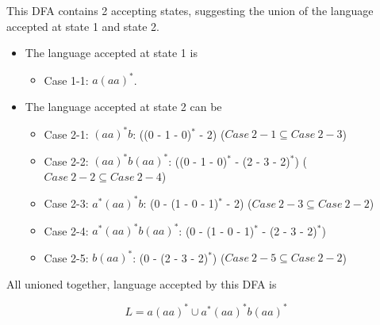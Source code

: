\documentclass[12pt]{article}
\begin{document}
\section{}
\begin{center}
\end{center}
This DFA contains 2 accepting states, suggesting the union of the language accepted at state 1 and state 2.
\begin{itemize}
    \item The language accepted at state 1 is 
    \begin{itemize}
        \item Case 1-1: \(a(aa)^*\).
    \end{itemize}
    \item The language accepted at state 2 can be 
    \begin{itemize}
        \item  Case 2-1: \((aa)^*b\): ((0 - 1 - 0)\(^*\) - 2) (\(Case\ 2-1 \subseteq Case\ 2-3\))
        \item  Case 2-2: \((aa)^*b(aa)^*\):  ((0 - 1 - 0)\(^*\) - (2 - 3 - 2)\(^*\)) (\(Case\ 2-2 \subseteq Case\ 2-4\))
        \item  Case 2-3: \(a^*(aa)^*b\):  (0 - (1 - 0 - 1)\(^*\) - 2) (\(Case\ 2-3 \subseteq Case\ 2-2\))
        \item  Case 2-4: \(a^*(aa)^*b(aa)^*\):  (0 - (1 - 0 - 1)\(^*\) - (2 - 3 - 2)\(^*\))
        \item  Case 2-5: \(b(aa)^*\): (0 - (2 - 3 - 2)\(^*\)) (\(Case\ 2-5 \subseteq Case\ 2-2\))
    \end{itemize}
\end{itemize}
All unioned together, language accepted by this DFA is 
    \begin{center}
        \[L = a(aa)^* \cup a^*(aa)^*b(aa)^*\]
    \end{center}
\end{document}
